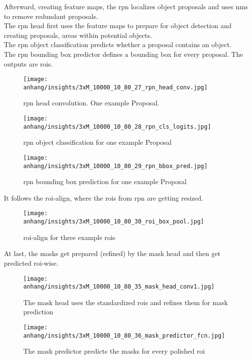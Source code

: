 	
	\FloatBarrier
	
	\clearpage
	Afterward, creating feature maps, the \ac{rpn} localizes object proposals and uses \ac{nms} to remove redundant proposals.\\
	The \ac{rpn} head first uses the feature maps to prepare for object detection and creating proposals, areas within potential objects.\\
	The \ac{rpn} object classification predicts whether a proposal contains an object.\\
	The \ac{rpn} bounding box predictor defines a bounding box for every proposal. The outputs are \ac{roi}s.
	
	\begin{figure}[H]
		\centering
		\texttt{[image: anhang/insights/3xM\_10000\_10\_80\_27\_rpn\_head\_conv.jpg]}
		\caption[\ac{rpn} head convolution. One example Proposal.]{\ac{rpn} head convolution. One example Proposal.}
	\end{figure}
	\begin{figure}[H]
		\centering
		\texttt{[image: anhang/insights/3xM\_10000\_10\_80\_28\_rpn\_cls\_logits.jpg]}
		\caption[\ac{rpn} object classification for one example Proposal]{\ac{rpn} object classification for one example Proposal}
	\end{figure}
	\begin{figure}[H]
		\centering
		\texttt{[image: anhang/insights/3xM\_10000\_10\_80\_29\_rpn\_bbox\_pred.jpg]}
		\caption[\ac{rpn} bounding box prediction for one example Proposal]{\ac{rpn} bounding box prediction for one example Proposal}
	\end{figure}
	
	
	\FloatBarrier
	
	It follows the \ac{roi}-align, where the \ac{roi}s from \ac{rpn} are getting resized.
	
	\begin{figure}[H]
		\centering
		\texttt{[image: anhang/insights/3xM\_10000\_10\_80\_30\_roi\_box\_pool.jpg]}
		\caption[\ac{roi}-align for three example \ac{roi}s]{\ac{roi}-align for three example \ac{roi}s}
	\end{figure}
	
	\FloatBarrier
	\clearpage
	At last, the masks get prepared (refined) by the mask head and then get predicted \ac{roi}-wise.
	
	\begin{figure}[H]
		\centering
		\texttt{[image: anhang/insights/3xM\_10000\_10\_80\_35\_mask\_head\_conv1.jpg]}
		\caption[The mask head uses the standardized \ac{roi}s and refines them for mask prediction]{The mask head uses the standardized \ac{roi}s and refines them for mask prediction}
	\end{figure}
	\begin{figure}[H]
		\centering
		\texttt{[image: anhang/insights/3xM\_10000\_10\_80\_36\_mask\_predictor\_fcn.jpg]}
		\caption[The mask predictor predicts the masks for every polished \ac{roi}]{The mask predictor predicts the masks for every polished \ac{roi}}
	\end{figure}
	
